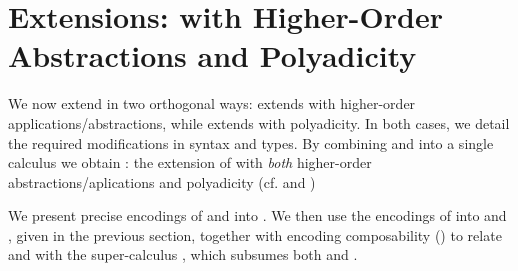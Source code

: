 \documentclass[preprint,11pt]{elsarticle}
\begin{document}
{%

\section{Extensions: \HOp with Higher-Order Abstractions and Polyadicity}
\label{sec:extension}
%

We now extend \HOp in two orthogonal ways: %
\HOpp  extends   \HOp with higher-order applications/abstractions, while
\PHOp   extends  \HOp
with polyadicity.
In both cases, we detail the
required modifications in syntax and types.
By combining \HOpp and \PHOp into a single calculus we obtain \PHOpp:
the extension of \HOp with \emph{both} higher-order
abstractions/aplications and polyadicity (cf.  and )

We present precise encodings of \HOpp and \PHOp into \HOp.
We then use the encodings of \HOp into \HO and \sessp, given in the previous section, 
together with 
encoding composability () to relate \HO and \sessp with the super-calculus \PHOpp, which subsumes
both \HOpp and \PHOp.


}
\end{document}

